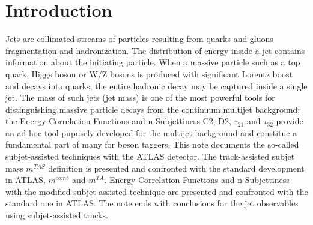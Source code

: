 \documentclass[UKenglish,texlive=2013]{\ATLASLATEXPATH atlasdoc}
\begin{document}
\maketitle

\tableofcontents


\section{Introduction}
\label{sec:intro}



Jets are collimated streams of particles resulting from quarks and gluons fragmentation and hadronization.
The distribution of energy inside a jet contains information about the initiating particle. When a massive
particle such as a top quark, Higgs boson or W/Z bosons is produced with significant Lorentz boost and decays into
quarks, the entire hadronic decay may be captured inside a single jet. The mass of such jets (jet mass)
is one of the most powerful tools for distinguishing massive particle decays from the continuum multijet
background; the Energy Correlation Functions and n-Subjettiness C2, D2, $\tau_{21}$ and $\tau_{32}$ provide an ad-hoc tool pupusely developed for the multijet background and constitue a fundamental part of many for boson taggers.
This note documents the so-called subjet-assisted techniques with the ATLAS detector. 
The track-assisted subjet mass $m^{TAS}$ definition is presented and confronted with the standard development in ATLAS, $m^{comb}$ and $m^{TA}$. 
Energy Correlation Functions and n-Subjettiness with the modified subjet-assisted technique are presented and confronted with the standard one in ATLAS.
The note ends with conclusions for the jet observables using subjet-assisted tracks.


\end{document}

